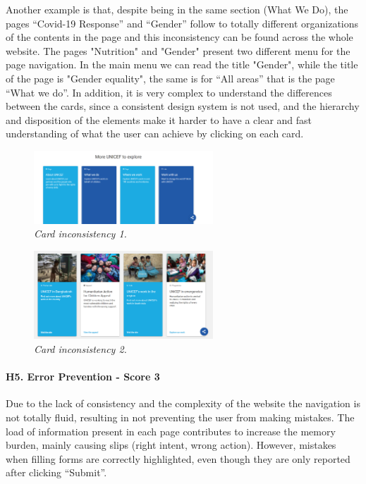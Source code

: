 Another example is that, despite being in the same section (What We Do), the pages “Covid-19 Response” and “Gender” follow to totally different organizations of the contents in the page and this inconsistency can be found across the whole website. The pages "Nutrition" and "Gender" present two different menu for the page navigation. In the main menu we can read the title "Gender", while the title of the page is "Gender equality", the same is for “All areas” that is the page “What we do”.
In addition, it is very complex to understand the differences between the cards, since a consistent design system is not used, and the hierarchy and disposition of the elements make it harder to have a clear and fast understanding of what the user can achieve by clicking on each card.
\\
\begin{figure}[h]
	\centering
	\begin{center}
		\includegraphics[width=0.6\textwidth]{Picture8.png}
	\end{center}
	\captionsetup{font=small}
	\caption{\textit{Card inconsistency 1.}}
	\label{fig:label8}
\end{figure}

\begin{figure}[h]
	\centering
	\begin{center}
		\includegraphics[width=0.6\textwidth]{Picture9.png}
	\end{center}
	\captionsetup{font=small}
	\caption{\textit{Card inconsistency 2.}}
	\label{fig:label9}
\end{figure}

\paragraph*{H5. Error Prevention - Score 3}
Due to the lack of consistency and the complexity of the website the navigation is not totally fluid, resulting in not preventing the user from making mistakes. The load of information present in each page contributes to increase the memory burden, mainly causing slips (right intent, wrong action). However, mistakes when filling forms are correctly highlighted, even though they are only reported after clicking “Submit”. 

